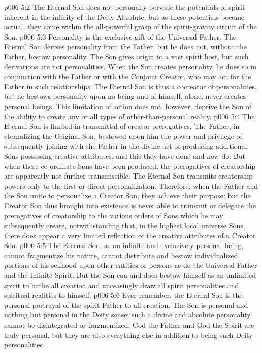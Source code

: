 \vs p006 5:2 The Eternal Son does not personally pervade the potentials of spirit inherent in the infinity of the Deity Absolute, but as these potentials become actual, they come within the all\hyp{}powerful grasp of the spirit\hyp{}gravity circuit of the Son.
\vs p006 5:3 Personality is the exclusive gift of the Universal Father. The Eternal Son derives personality from the Father, but he does not, without the Father, bestow personality. The Son gives origin to a vast spirit host, but such derivations are not personalities. When the Son creates personality, he does so in conjunction with the Father or with the Conjoint Creator, who may act for the Father in such relationships. The Eternal Son is thus a cocreator of personalities, but he bestows personality upon no being and of himself, alone, never creates personal beings. This limitation of action does not, however, deprive the Son of the ability to create any or all types of other\hyp{}than\hyp{}personal reality.
\vs p006 5:4 The Eternal Son is limited in transmittal of creator prerogatives. The Father, in eternalizing the Original Son, bestowed upon him the power and privilege of subsequently joining with the Father in the divine act of producing additional Sons possessing creative attributes, and this they have done and now do. But when these co\hyp{}ordinate Sons have been produced, the prerogatives of creatorship are apparently not further transmissible. The Eternal Son transmits creatorship powers only to the first or direct personalization. Therefore, when the Father and the Son unite to personalize a Creator Son, they achieve their purpose; but the Creator Son thus brought into existence is never able to transmit or delegate the prerogatives of creatorship to the various orders of Sons which he may subsequently create, notwithstanding that, in the highest local universe Sons, there does appear a very limited reflection of the creative attributes of a Creator Son.
\vs p006 5:5 The Eternal Son, as an infinite and exclusively personal being, cannot fragmentize his nature, cannot distribute and bestow individualized portions of his selfhood upon other entities or persons as do the Universal Father and the Infinite Spirit. But the Son can and does bestow himself as an unlimited spirit to bathe all creation and unceasingly draw all spirit personalities and spiritual realities to himself.
\vs p006 5:6 Ever remember, the Eternal Son is the personal portrayal of the spirit Father to all creation. The Son is personal and nothing but personal in the Deity sense; such a divine and absolute personality cannot be disintegrated or fragmentized. God the Father and God the Spirit are truly personal, but they are also everything else in addition to being such Deity personalities.
